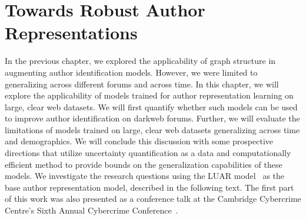 \chapter{Towards Robust Author Representations}
\label{chp:stylometry_extensions}

In the previous chapter, we explored the applicability of graph structure in augmenting author identification models. 
However, we were limited to generalizing across different forums and across time.
In this chapter, we will explore the applicability of models trained for author representation learning on large, clear web datasets.
We will first quantify whether such models can be used to improve author identification on darkweb forums.
Further, we will evaluate the limitations of models trained on large, clear web datasets  generalizing across time and demographics.
We will conclude this discussion with some prospective directions that utilize uncertainty quantification as a data and computationally efficient method to provide bounds on the generalization capabilities of these models.
We investigate the research questions using the LUAR model~\citep{riverastao2021learning} as the base author representation model, described in the following text.
The first part of this work was also presented as a conference talk at the Cambridge Cybercrime Centre's Sixth Annual Cybercrime Conference~\citep{maneriker2023following}.




